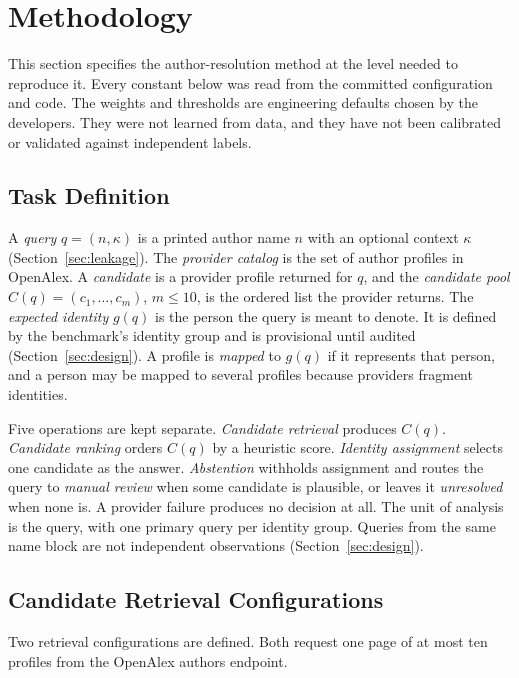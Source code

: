 \section{Methodology}
\label{sec:methodology}

This section specifies the author-resolution method at the level needed to reproduce it. Every constant below was read from the committed configuration and code. The weights and thresholds are engineering defaults chosen by the developers. They were not learned from data, and they have not been calibrated or validated against independent labels.

\subsection{Task Definition}
\label{sec:task}
A \emph{query} $q=(n,\kappa)$ is a printed author name $n$ with an optional context $\kappa$ (Section~\ref{sec:leakage}). The \emph{provider catalog} is the set of author profiles in OpenAlex. A \emph{candidate} is a provider profile returned for $q$, and the \emph{candidate pool} $C(q)=(c_1,\dots,c_m)$, $m\le 10$, is the ordered list the provider returns. The \emph{expected identity} $g(q)$ is the person the query is meant to denote. It is defined by the benchmark's identity group and is provisional until audited (Section~\ref{sec:design}). A profile is \emph{mapped} to $g(q)$ if it represents that person, and a person may be mapped to several profiles because providers fragment identities.

Five operations are kept separate. \emph{Candidate retrieval} produces $C(q)$. \emph{Candidate ranking} orders $C(q)$ by a heuristic score. \emph{Identity assignment} selects one candidate as the answer. \emph{Abstention} withholds assignment and routes the query to \emph{manual review} when some candidate is plausible, or leaves it \emph{unresolved} when none is. A provider failure produces no decision at all. The unit of analysis is the query, with one primary query per identity group. Queries from the same name block are not independent observations (Section~\ref{sec:design}).

\subsection{Candidate Retrieval Configurations}
\label{sec:retrieval}
Two retrieval configurations are defined. Both request one page of at most ten profiles from the OpenAlex authors endpoint.

